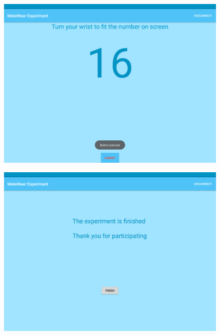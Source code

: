 \begin{figure}[h!]
\centering
\begin{minipage}{.55\textwidth}
  \centering
  \includegraphics[width=0.95\linewidth]{figures/tablet_screen16.png}
  \label{app_wrist_int}
\end{minipage}%
\begin{minipage}{.55\textwidth}
  \centering
  \includegraphics[width=0.95\linewidth]{figures/tablet_screen17.png}
  \label{app_finish}
\end{minipage}
\end{figure}

